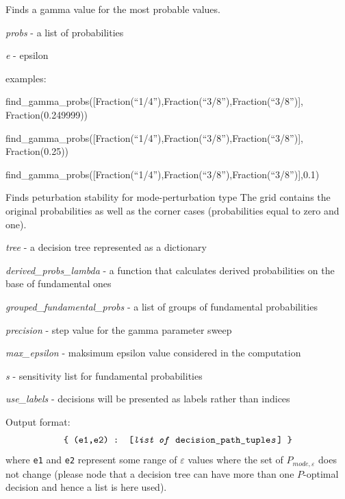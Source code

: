 \documentclass[a4paper,10pt,english]{sphinxmanual}
\begin{document}
\begin{fulllineitems}
	\label{index:chondro.find_gamma_probs}
	Finds a gamma value for the most probable values.
	
	\emph{probs} - a list of probabilities
	
	\emph{e} - epsilon
	
	examples:
	
	find\_gamma\_probs({[}Fraction(``1/4''),Fraction(``3/8''),Fraction(``3/8''){]},    Fraction(0.249999))
	
	find\_gamma\_probs({[}Fraction(``1/4''),Fraction(``3/8''),Fraction(``3/8''){]},    Fraction(0.25))
	
	find\_gamma\_probs({[}Fraction(``1/4''),Fraction(``3/8''),Fraction(``3/8''){]},0.1)
	
\end{fulllineitems}


\begin{fulllineitems}
	\label{index:chondro.find_perturbation_mode}
	Finds peturbation stability for mode-perturbation type
	The grid contains the original probabilities as well as the corner cases 
	(probabilities equal to zero and one).
	
	\emph{tree} - a decision tree represented as a dictionary
	
	\emph{derived\_probs\_lambda} - a function that calculates derived probabilities
	on the base of fundamental ones
	
	\emph{grouped\_fundamental\_probs} - a list of groups of fundamental probabilities
	
	\emph{precision} - step value for the gamma parameter sweep
	
	\emph{max\_epsilon} - maksimum epsilon value considered in the computation
	
	\emph{s} - sensitivity list for fundamental probabilities
	
	\emph{use\_labels} - decisions will be presented as labels rather than indices
	
	Output format:	
	\begin{equation*}
		\texttt{\{ (e1,e2) : [\textit{list of} decision\_path\_tuple\textit{s}] \}}
	\end{equation*}
	where \texttt{e1} and \texttt{e2} represent some range of $\varepsilon$ values where the set of $P_{mode,\varepsilon}$ does not change (please node that a decision tree can have more than one $P$-optimal decision and hence a list is here used).
	
\end{fulllineitems}
\end{document}

